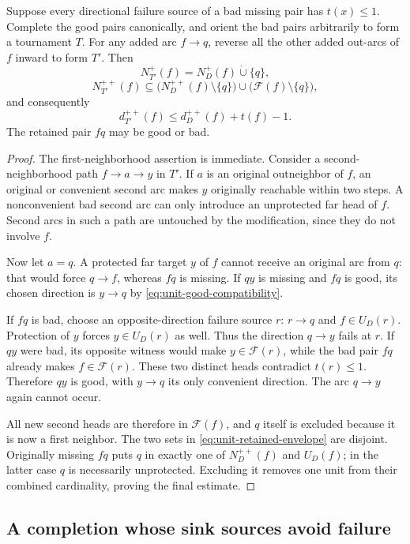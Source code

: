 \begin{lemma}
\label{lem:unit-safe-retained}
Suppose every directional failure source of a bad missing pair has
$t(x)\le1$.  Complete the good pairs canonically, and orient the bad
pairs arbitrarily to form a tournament $T$.
For any added arc $f\to q$, reverse all the other added out-arcs
of $f$ inward to form $T'$.
Then
\[
 N_{T'}^+(f)=N_D^+(f)\dot\cup\{q\},
\]
\[
 {
 N_{T'}^{++}(f)\subseteq
 \bigl(N_D^{++}(f)\setminus\{q\}\bigr)
 \cup\bigl(\mathcal F(f)\setminus\{q\}\bigr),}
 \tag{UF2}\label{eq:unit-retained-envelope}
\]
and consequently
\[
 {d_{T'}^{++}(f)\le d_D^{++}(f)+t(f)-1.}
\]
The retained pair $fq$ may be good or bad.
\end{lemma}
\begin{proof}
The first-neighborhood assertion is immediate.
Consider a second-neighborhood path $f\to a\to y$ in $T'$.
If $a$ is an original outneighbor of $f$, an original or convenient
second arc makes $y$ originally reachable within two steps.
A nonconvenient bad second arc can only introduce an unprotected
far head of $f$.  Second arcs in such a path are untouched by the
modification, since they do not involve $f$.

Now let $a=q$.  A protected far target $y$ of $f$ cannot receive
an original arc from $q$: that would force $q\to f$, whereas $fq$
is missing.  If $qy$ is missing and $fq$ is good, its chosen direction
is $y\to q$ by \eqref{eq:unit-good-compatibility}.

If $fq$ is bad, choose an opposite-direction failure source $r$:
$r\to q$ and $f\in U_D(r)$.
Protection of $y$ forces $y\in U_D(r)$ as well.
Thus the direction $q\to y$ fails at $r$.
If $qy$ were bad, its opposite witness would make
$y\in\mathcal F(r)$, while the bad pair $fq$ already makes
$f\in\mathcal F(r)$.  These two distinct heads contradict $t(r)\le1$.
Therefore $qy$ is good, with $y\to q$ its only convenient direction.
The arc $q\to y$ again cannot occur.

All new second heads are therefore in $\mathcal F(f)$, and $q$
itself is excluded because it is now a first neighbor.
The two sets in \eqref{eq:unit-retained-envelope} are disjoint.
Originally missing $fq$ puts $q$ in exactly one of
$N_D^{++}(f)$ and $U_D(f)$; in the latter case $q$ is necessarily
unprotected.  Excluding it removes one unit from their combined
cardinality, proving the final estimate.
\end{proof}

\subsection{A completion whose sink sources avoid failure}

